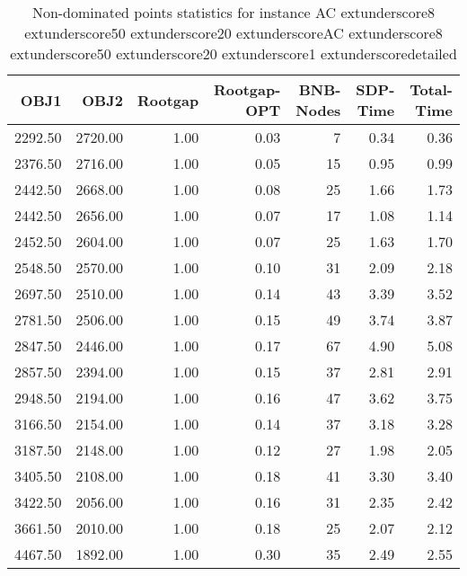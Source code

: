 \begin{table}
\caption{Non-dominated points statistics for instance AC	extunderscore8	extunderscore50	extunderscore20	extunderscoreAC	extunderscore8	extunderscore50	extunderscore20	extunderscore1	extunderscoredetailed}
\label{tab:stats/AC_8_50_20_AC_8_50_20_1_detailed}
\begin{tabular}{rrrrrrr}
\toprule
OBJ1 & OBJ2 & Rootgap & Rootgap-OPT & BNB-Nodes & SDP-Time & Total-Time \\
\midrule
2292.50 & 2720.00 & 1.00 & 0.03 & 7 & 0.34 & 0.36 \\
2376.50 & 2716.00 & 1.00 & 0.05 & 15 & 0.95 & 0.99 \\
2442.50 & 2668.00 & 1.00 & 0.08 & 25 & 1.66 & 1.73 \\
2442.50 & 2656.00 & 1.00 & 0.07 & 17 & 1.08 & 1.14 \\
2452.50 & 2604.00 & 1.00 & 0.07 & 25 & 1.63 & 1.70 \\
2548.50 & 2570.00 & 1.00 & 0.10 & 31 & 2.09 & 2.18 \\
2697.50 & 2510.00 & 1.00 & 0.14 & 43 & 3.39 & 3.52 \\
2781.50 & 2506.00 & 1.00 & 0.15 & 49 & 3.74 & 3.87 \\
2847.50 & 2446.00 & 1.00 & 0.17 & 67 & 4.90 & 5.08 \\
2857.50 & 2394.00 & 1.00 & 0.15 & 37 & 2.81 & 2.91 \\
2948.50 & 2194.00 & 1.00 & 0.16 & 47 & 3.62 & 3.75 \\
3166.50 & 2154.00 & 1.00 & 0.14 & 37 & 3.18 & 3.28 \\
3187.50 & 2148.00 & 1.00 & 0.12 & 27 & 1.98 & 2.05 \\
3405.50 & 2108.00 & 1.00 & 0.18 & 41 & 3.30 & 3.40 \\
3422.50 & 2056.00 & 1.00 & 0.16 & 31 & 2.35 & 2.42 \\
3661.50 & 2010.00 & 1.00 & 0.18 & 25 & 2.07 & 2.12 \\
4467.50 & 1892.00 & 1.00 & 0.30 & 35 & 2.49 & 2.55 \\
\bottomrule
\end{tabular}
\end{table}
